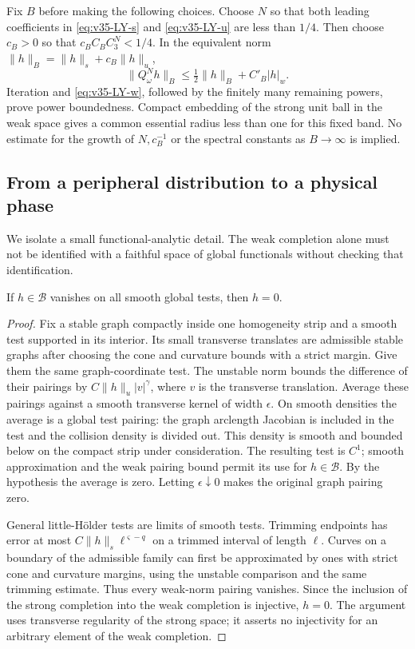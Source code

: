 Fix $B$ before making the following choices. Choose $N$ so that both
leading coefficients in \eqref{eq:v35-LY-s} and
\eqref{eq:v35-LY-u} are less than $1/4$. Then choose $c_B>0$ so that
$c_B C_B C_3^N<1/4$. In the equivalent norm
$\|h\|_B=\|h\|_s+c_B\|h\|_u$,
\[
 \|Q_\omega^N h\|_B\le\tfrac12\|h\|_B+C'_B|h|_w.
\]
Iteration and \eqref{eq:v35-LY-w}, followed by the finitely many
remaining powers, prove power boundedness. Compact embedding of the
strong unit ball in the weak space gives a common essential radius
less than one for this fixed band. No estimate for the growth of
$N,c_B^{-1}$ or the spectral constants as $B\to\infty$ is implied.

\subsection{From a peripheral distribution to a physical phase}
We isolate a small functional-analytic detail. The weak completion
alone must not be identified with a faithful space of global
functionals without checking that identification.

\begin{lemma}
\label{lem:v35-faithful-strong}
If $h\in\mathcal B$ vanishes on all smooth global tests, then $h=0$.
\end{lemma}
\begin{proof}
Fix a stable graph compactly inside one homogeneity strip and a smooth
test supported in its interior. Its small transverse translates are
admissible stable graphs after choosing the cone and curvature bounds
with a strict margin. Give them the same graph-coordinate test. The
unstable norm bounds the difference of their pairings by
$C\|h\|_u|v|^\gamma$, where $v$ is the transverse translation.
Average these pairings against a smooth transverse kernel of width
$\epsilon$. On smooth densities the average is a global test pairing:
the graph arclength Jacobian is included in the test and the collision
density is divided out. This density is smooth and bounded below on
the compact strip under consideration. The resulting test is $C^1$;
smooth approximation and the weak pairing bound permit its use for
$h\in\mathcal B$. By the hypothesis the average is zero. Letting
$\epsilon\downarrow0$ makes the original graph pairing zero.

General little-H\"older tests are limits of smooth tests. Trimming
endpoints has error at most $C\|h\|_s\ell^{\varsigma-q}$ on a trimmed
interval of length $\ell$. Curves on a boundary of the admissible
family can first be approximated by ones with strict cone and curvature
margins, using the unstable comparison and the same trimming estimate.
Thus every weak-norm pairing vanishes. Since the inclusion of the
strong completion into the weak completion is injective, $h=0$.
The argument uses transverse regularity of the strong space; it asserts
no injectivity for an arbitrary element of the weak completion.
\end{proof}

